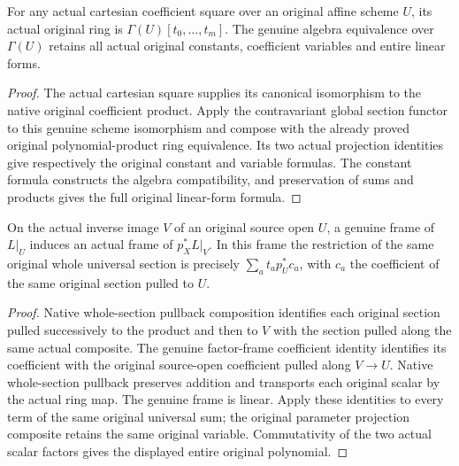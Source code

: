 \begin{lemma}
\label{lem:kn-nadel-bertini-cartesian-coefficient-chart}
\leanok
{}
For any actual cartesian coefficient square over an original affine
scheme $U$, its actual original ring is $\Gamma(U)[t_0,\ldots,t_m]$.
The genuine algebra equivalence over $\Gamma(U)$ retains all actual
original constants, coefficient variables and entire linear forms.
\end{lemma}
\begin{proof}
The actual cartesian square supplies its canonical isomorphism to the
native original coefficient product. Apply the contravariant global
section functor to this genuine scheme isomorphism and compose with the
already proved original polynomial-product ring equivalence. Its two
actual projection identities give respectively the original constant and
variable formulas. The constant formula constructs the algebra
compatibility, and preservation of sums and products gives the full
original linear-form formula.
\end{proof}

\begin{lemma}
\label{lem:kn-nadel-bertini-restricted-universal-frame}
\leanok
{}
On the actual inverse image $V$ of an original source open $U$, a genuine
frame of $L|_U$ induces an actual frame of $p_X^*L|_V$. In this frame the
restriction of the same original whole universal section is precisely
$\sum_a t_a p_U^*c_a$, with $c_a$ the coefficient of the same original
section pulled to $U$.
\end{lemma}
\begin{proof}
Native whole-section pullback composition identifies each original section
pulled successively to the product and then to $V$ with the section pulled
along the same actual composite. The genuine factor-frame coefficient
identity identifies its coefficient with the original source-open
coefficient pulled along $V\to U$. Native whole-section pullback preserves
addition and transports each original scalar by the actual ring map.
The genuine frame is linear. Apply these identities to every term of the
same original universal sum; the original parameter projection composite
retains the same original variable. Commutativity of the two actual scalar
factors gives the displayed entire original polynomial.
\end{proof}

